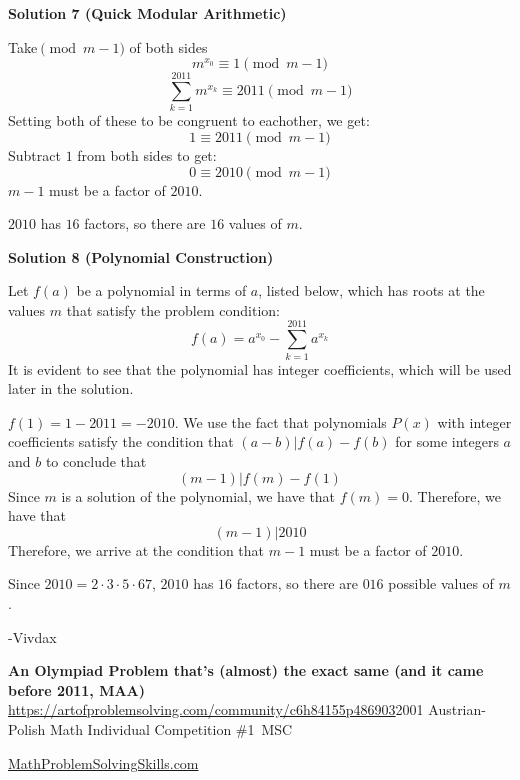 \begin{enumerate}
 



\textbf{Solution 7 (Quick Modular Arithmetic)}

Take$\pmod {m-1}$ of both sides
 \[m^{x_0} \equiv 1 \pmod {m-1}\]
 \[\sum_{k = 1}^{2011} m^{x_k} \equiv 2011 \pmod {m-1}\]Setting both of these to be congruent to eachother, we get:
 \[1 \equiv 2011 \pmod {m-1}\]Subtract $1$ from both sides to get:
 \[0 \equiv 2010 \pmod {m-1}\]$m-1$ must be a factor of $2010$.

 $2010$ has $16$ factors, so there are $\boxed{16}$ values of $m$.

 



\textbf{Solution 8 (Polynomial Construction)}

Let $f(a)$ be a polynomial in terms of $a$, listed below, which has roots at the values $m$ that satisfy the problem condition: 
 \[f(a) = a^{x_0} - \sum_{k=1}^{2011} a^{x_k}\] It is evident to see that the polynomial has integer coefficients, which will be used later in the solution.

 $f(1) = 1 - 2011 = -2010$. We use the fact that polynomials $P(x)$ with integer coefficients satisfy the condition that $(a-b)|f(a)-f(b)$ for some integers $a$ and $b$ to conclude that 
 \[(m-1)|f(m)-f(1)\] Since $m$ is a solution of the polynomial, we have that $f(m) = 0$. Therefore, we have that 
 \[(m-1)|2010\] Therefore, we arrive at the condition that $m-1$ must be a factor of $2010$.

 Since $2010=2\cdot 3\cdot 5\cdot 67$, $2010$ has $16$ factors, so there are $\boxed{016}$ possible values of $m$. 

 -Vivdax

 \textbf{An Olympiad Problem that's (almost) the exact same (and it came before 2011, MAA)} \href{https://artofproblemsolving.com/community/c6h84155p486903}{https://artofproblemsolving.com/community/c6h84155p486903}2001 Austrian-Polish Math Individual Competition \#1~MSC

 \href{https://mathproblemsolvingskills.wordpress.com/}{MathProblemSolvingSkills.com}

 


 



\end{enumerate}
